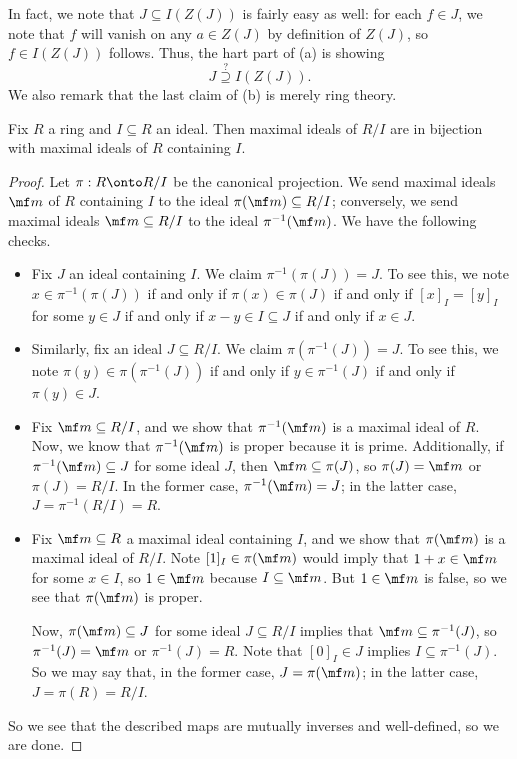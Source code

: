 \documentclass[../notes.tex]{subfiles}
\begin{document}
In fact, we note that $J\subseteq I(Z(J))$ is fairly easy as well: for each $f\in J$, we note that $f$ will vanish on any $a\in Z(J)$ by definition of $Z(J)$, so $f\in I(Z(J))$ follows. Thus, the hart part of (a) is showing
\[J\stackrel?\supseteq I(Z(J)).\]
We also remark that the last claim of (b) is merely ring theory.
\begin{lemma} \label{lem:pullmax}
	Fix $R$ a ring and $I\subseteq R$ an ideal. Then maximal ideals of $R/I$ are in bijection with maximal ideals of $R$ containing $I$.
\end{lemma}
\begin{proof}
	Let $\pi:R\onto R/I$ be the canonical projection. We send maximal ideals $\mf m$ of $R$ containing $I$ to the ideal $\pi(\mf m)\subseteq R/I$; conversely, we send maximal ideals $\mf m\subseteq R/I$ to the ideal $\pi^{-1}(\mf m)$. We have the following checks.
	\begin{itemize}
		\item Fix $J$ an ideal containing $I$. We claim $\pi^{-1}(\pi(J))=J$. To see this, we note $x\in\pi^{-1}(\pi(J))$ if and only if $\pi(x)\in\pi(J)$ if and only if $[x]_I=[y]_I$ for some $y\in J$ if and only if $x-y\in I\subseteq J$ if and only if $x\in J$.
		\item Similarly, fix an ideal $J\subseteq R/I$. We claim $\pi\left(\pi^{-1}(J)\right)=J$. To see this, we note $\pi(y)\in\pi\left(\pi^{-1}(J)\right)$ if and only if $y\in\pi^{-1}(J)$ if and only if $\pi(y)\in J$.
		\item Fix $\mf m\subseteq R/I$, and we show that $\pi^{-1}(\mf m)$ is a maximal ideal of $R$. Now, we know that $\pi^{-1}(\mf m)$ is proper because it is prime. Additionally, if $\pi^{-1}(\mf m)\subseteq J$ for some ideal $J$, then $\mf m\subseteq\pi(J)$, so $\pi(J)=\mf m$ or $\pi(J)=R/I$. In the former case, $\pi^{-1}(\mf m)=J$; in the latter case, $J=\pi^{-1}(R/I)=R$.
		\item Fix $\mf m\subseteq R$ a maximal ideal containing $I$, and we show that $\pi(\mf m)$ is a maximal ideal of $R/I$. Note $[1]_I\in\pi(\mf m)$ would imply that $1+x\in\mf m$ for some $x\in I$, so $1\in\mf m$ because $I\subseteq\mf m$. But $1\in\mf m$ is false, so we see that $\pi(\mf m)$ is proper.

		Now, $\pi(\mf m)\subseteq J$ for some ideal $J\subseteq R/I$ implies that $\mf m\subseteq\pi^{-1}(J)$, so $\pi^{-1}(J)=\mf m$ or $\pi^{-1}(J)=R$. Note that $[0]_I\in J$ implies $I\subseteq\pi^{-1}(J)$. So we may say that, in the former case, $J=\pi(\mf m)$; in the latter case, $J=\pi(R)=R/I$.
	\end{itemize}
	So we see that the described maps are mutually inverses and well-defined, so we are done.
\end{proof}
\end{document}
